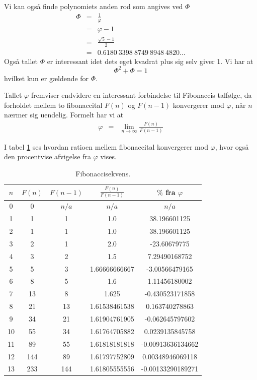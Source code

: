 {Vi kan også finde polynomiets anden rod som angives ved $\varPhi$
\begin{eqnarray}
	\varPhi & = & \frac{1}{\varphi} \\
		& = & \varphi - 1 \\
        & = & \frac{\sqrt{5} - 1}{2} \\
		& = & 0.6180\ 3398\ 8749\ 8948\ 4820 \dots
		\label{mange_tal}
\end{eqnarray}
Også tallet $\varPhi$ er interessant idet dets eget kvadrat plus sig
selv giver 1. Vi har at
\begin{equation}
	\varPhi^{2} + \varPhi = 1
	\label{Phi_squared}
\end{equation}
hvilket kun er gældende for $\varPhi$.

Tallet $\varphi$ fremviser endvidere en interessant forbindelse til
Fibonaccis talfølge, da forholdet mellem to fibonaccital $F(n)$ og $F(n
- 1)$ konvergerer mod $\varphi$, når $n$ nærmer sig uendelig. Formelt har
vi at
\begin{eqnarray*}
	\varphi & =     & \lim_{n \rightarrow\infty}{\frac{F(n)}{F(n - 1)}}
\end{eqnarray*}

I tabel \ref{fibonacci_sequence} ses hvordan ratioen mellem fibonaccital
konvergerer mod $\varphi$, hvor også den procentvise afvigelse fra
$\varphi$ vises.

\begin{table}[h!]
    \centering
    \begin{tabular}{|c|c|c|c|c|}
        \hline
        $n$ & $F(n)$ & $F(n - 1)$ & $ \frac{F(n)}{F(n - 1)}$ & $\%$ fra $\varphi$ \\
        \hline
        0	 & 0 	 & $n/a$ & $n/a$ 		& $n/a$ 		\\
        1	 & 1	 & 1	 & 1.0		 	& 38.196601125 		\\
        2	 & 1	 & 1	 & 1.0		 	& 38.196601125 		\\
        3	 & 2	 & 1	 & 2.0		 	& -23.60679775 		\\
        4	 & 3	 & 2	 & 1.5			& 7.29490168752 	\\
        5	 & 5	 & 3	 & 1.66666666667	& -3.00566479165 	\\
        6	 & 8	 & 5	 & 1.6			& 1.11456180002 	\\
        7	 & 13	 & 8	 & 1.625	 	& -0.430523171858 	\\
        8	 & 21	 & 13	 & 1.61538461538	& 0.163740278863 	\\
        9	 & 34	 & 21	 & 1.61904761905	& -0.062645797602 	\\
        10	 & 55	 & 34	 & 1.61764705882	& 0.0239135845758 	\\
        11	 & 89	 & 55	 & 1.61818181818	& -0.00913636134662 	\\
        12	 & 144	 & 89	 & 1.61797752809	& 0.00348946069118 	\\
        13	 & 233	 & 144	 & 1.61805555556	& -0.00133290189271 	\\
        \hline
    \end{tabular}
    \caption{Fibonaccisekvens.}
    \label{fibonacci_sequence}
\end{table}

}
